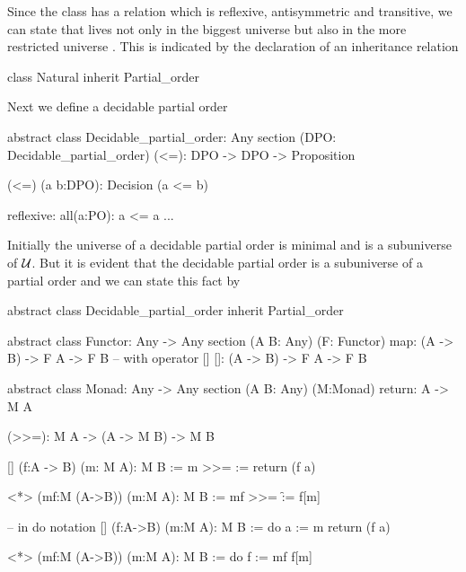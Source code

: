 Since the class  has a relation \code{<=} which is reflexive,
antisymmetric and transitive, we can state that  lives not only
in the biggest universe  but also in the more restricted universe
. This is indicated by the declaration of an
inheritance relation
%
\begin{alba}
  class Natural inherit Partial_order
\end{alba}

Next we define a decidable partial order
%
\begin{alba}
  abstract class
    Decidable_partial_order: Any
  section (DPO: Decidable_partial_order)
    (<=): DPO -> DPO -> Proposition

    (<=) (a b:DPO): Decision (a <= b)

    reflexive: all(a:PO): a <= a
    ...
\end{alba}
%
Initially the universe of a decidable partial order is minimal and is a
subuniverse of ${\cal{U}}$. But it is evident that the decidable partial order is a
subuniverse of a partial order and we can state this fact by
%
\begin{alba}
  abstract class Decidable_partial_order inherit Partial_order
\end{alba}



\begin{alba}
  abstract class
    Functor: Any -> Any
  section (A B: Any) (F: Functor)
    map: (A -> B) -> F A  -> F B
    -- with operator []
    []:  (A -> B) -> F A  -> F B
\end{alba}


\begin{alba}
  abstract
    class Monad: Any -> Any
  section (A B: Any) (M:Monad)
    return: A -> M A

    (>>=): M A  -> (A -> M B) -> M B

    [] (f:A -> B) (m: M A): M B :=
      m >>= \a := return  (f a)

    <*> (mf:M (A->B)) (m:M A): M B :=
      mf >>= \f  := f[m]

    -- in do notation
    [] (f:A->B) (m:M A): M B :=
      do
        a := m
        return  (f a)

    <*> (mf:M (A->B)) (m:M A): M B :=
      do
        f := mf
        f[m]
\end{alba}








